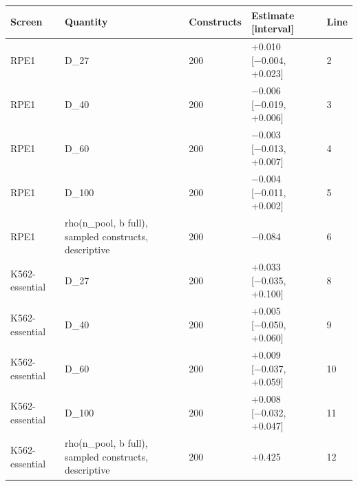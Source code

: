 \begin{tabular}{lllll}
\toprule
Screen & Quantity & Constructs & Estimate [interval] & Line \\
\midrule
RPE1 & D\_27 & 200 & +0.010 [−0.004, +0.023] & 2 \\
RPE1 & D\_40 & 200 & −0.006 [−0.019, +0.006] & 3 \\
RPE1 & D\_60 & 200 & −0.003 [−0.013, +0.007] & 4 \\
RPE1 & D\_100 & 200 & −0.004 [−0.011, +0.002] & 5 \\
RPE1 & rho(n\_pool, b full), sampled constructs, descriptive & 200 & −0.084 & 6 \\
K562-essential & D\_27 & 200 & +0.033 [−0.035, +0.100] & 8 \\
K562-essential & D\_40 & 200 & +0.005 [−0.050, +0.060] & 9 \\
K562-essential & D\_60 & 200 & +0.009 [−0.037, +0.059] & 10 \\
K562-essential & D\_100 & 200 & +0.008 [−0.032, +0.047] & 11 \\
K562-essential & rho(n\_pool, b full), sampled constructs, descriptive & 200 & +0.425 & 12 \\
\bottomrule
\end{tabular}
